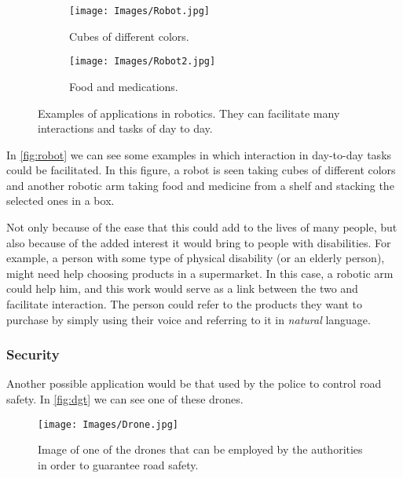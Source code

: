 \begin{figure}[htb]
  \centering
  \begin{subfigure}[t]{.55\textwidth}
    \centering
    \caption{Cubes of different colors.}
    \texttt{[image: Images/Robot.jpg]}
  \end{subfigure}\hfill
  \begin{subfigure}[t]{.4\textwidth}
    \centering
    \caption{Food and medications.}
    \texttt{[image: Images/Robot2.jpg]}
  \end{subfigure}
  \caption[Examples of applications in robotics]{Examples of applications in
    robotics. They can facilitate many interactions and tasks of day to day.}
  \label{fig:robot}
\end{figure}

In \vref{fig:robot} we can see some examples in which interaction in day-to-day
tasks could be facilitated. In this figure, a robot is seen taking cubes of
different colors and another robotic arm taking food and medicine from a shelf
and stacking the selected ones in a box.

Not only because of the ease that this could add to the lives of many people,
but also because of the added interest it would bring to people with
disabilities. For example, a person with some type of physical disability (or
an elderly person), might need help choosing products in a supermarket. In this
case, a robotic arm could help him, and this work would serve as a link between
the two and facilitate interaction. The person could refer to the products they
want to purchase by simply using their voice and referring to it in
\emph{natural} language.

\subsubsection{Security}
Another possible application would be that used by the police to control road
safety. In \vref{fig:dgt} we can see one of these drones.

\begin{figure}[htb]
  \centering
  \texttt{[image: Images/Drone.jpg]}
  \caption[Drones employed for road safety]{Image of one of the drones that can
    be employed by the authorities in order to guarantee road safety.}
  \label{fig:dgt}
\end{figure}

